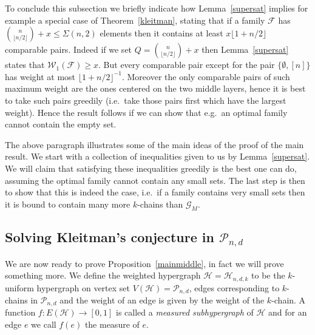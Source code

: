 \documentclass[12pt]{article}
\numberwithin{equation}{section}
\def\F{\mathcal{F}}
\def\G{\mathcal{G}}
\def\HH{\mathcal{H}}
\def\P{\mathcal{P}}
\def\W{\mathcal{W}}
\begin{document}
To conclude this subsection we briefly indicate how Lemma~\ref{supersat} implies for example a special case of Theorem~\ref{kleitman}, stating that if a family $\F$ has $\binom{n}{\lfloor n/2\rfloor}+x\leq \Sigma(n,2)$ elements then it contains at least $x\lfloor 1+ n/2\rfloor$ comparable pairs. Indeed if we set $Q=\binom{n}{\lfloor n/2 \rfloor}+x$ then Lemma~\ref{supersat} states that $\W_1(\F)\geq x$. But every comparable pair except for the pair $\{\emptyset,[n]\}$ has weight at most $\lfloor 1+ n/2\rfloor^{-1}$.  Moreover the only comparable pairs of such maximum weight are the ones centered on the two middle layers, hence it is best to take such pairs greedily (i.e.~take those pairs first which have the largest weight). Hence the result follows  if we can show that e.g.~an optimal family cannot contain the empty set.

The above paragraph illustrates some of the main ideas of the proof of the main result. We start with a collection of inequalities given to us by Lemma~\ref{supersat}. We will claim that satisfying these inequalities greedily is the best one can do, assuming the optimal family cannot contain any small sets. The last step is then to show that this is indeed the case, i.e.~if a family contains very small sets then it is bound to contain many more $k$-chains than $\G_M$.

\subsection{Solving Kleitman's conjecture in $\P_{n,d}$}

We are now ready to prove Proposition~\ref{mainmiddle}, in fact we will prove something more. We define the weighted hypergraph $\HH=\HH_{n,d,k}$ to be the $k$-uniform hypergraph on vertex set $V(\HH)=\P_{n,d}$, edges corresponding to $k$-chains in $\P_{n,d}$ and the weight of an edge is given by the weight of the $k$-chain. A function $f:E(\HH)\rightarrow [0,1]$ is called a \emph{measured subhypergraph} of $\HH$ and for an edge $e$ we call $f(e)$ the measure of $e$.
\end{document}
